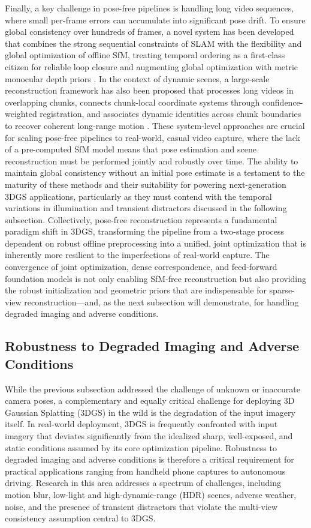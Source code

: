 \documentclass[11pt]{article}
\begin{document}
Finally, a key challenge in pose-free pipelines is handling long video sequences, where small per-frame errors can accumulate into significant pose drift. To ensure global consistency over hundreds of frames, a novel system has been developed that combines the strong sequential constraints of SLAM with the flexibility and global optimization of offline SfM, treating temporal ordering as a first-class citizen for reliable loop closure and augmenting global optimization with metric monocular depth priors \cite{ref281}. In the context of dynamic scenes, a large-scale reconstruction framework has also been proposed that processes long videos in overlapping chunks, connects chunk-local coordinate systems through confidence-weighted registration, and associates dynamic identities across chunk boundaries to recover coherent long-range motion \cite{ref282}. These system-level approaches are crucial for scaling pose-free pipelines to real-world, casual video capture, where the lack of a pre-computed SfM model means that pose estimation and scene reconstruction must be performed jointly and robustly over time. The ability to maintain global consistency without an initial pose estimate is a testament to the maturity of these methods and their suitability for powering next-generation 3DGS applications, particularly as they must contend with the temporal variations in illumination and transient distractors discussed in the following subsection. Collectively, pose-free reconstruction represents a fundamental paradigm shift in 3DGS, transforming the pipeline from a two-stage process dependent on robust offline preprocessing into a unified, joint optimization that is inherently more resilient to the imperfections of real-world capture. The convergence of joint optimization, dense correspondence, and feed-forward foundation models is not only enabling SfM-free reconstruction but also providing the robust initialization and geometric priors that are indispensable for sparse-view reconstruction---and, as the next subsection will demonstrate, for handling degraded imaging and adverse conditions.

\subsection{Robustness to Degraded Imaging and Adverse Conditions}

While the previous subsection addressed the challenge of unknown or inaccurate camera poses, a complementary and equally critical challenge for deploying 3D Gaussian Splatting (3DGS) in the wild is the degradation of the input imagery itself. In real-world deployment, 3DGS is frequently confronted with input imagery that deviates significantly from the idealized sharp, well-exposed, and static conditions assumed by its core optimization pipeline. Robustness to degraded imaging and adverse conditions is therefore a critical requirement for practical applications ranging from handheld phone captures to autonomous driving. Research in this area addresses a spectrum of challenges, including motion blur, low-light and high-dynamic-range (HDR) scenes, adverse weather, noise, and the presence of transient distractors that violate the multi-view consistency assumption central to 3DGS.
\end{document}
